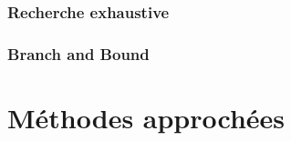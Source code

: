 \documentclass[aspectratio=169,11pt]{beamer}
\begin{document}
	\begin{frame}
		\frametitle{Recherche exhaustive}
		\centering\footnotesize
	\end{frame}

	\begin{frame}
		\centering\footnotesize
		
	\end{frame}

	\begin{frame}
		\centering\footnotesize
	\end{frame}

	\begin{frame}
		\frametitle{Branch and Bound}
		\centering%
		\resizebox{0.85\textwidth}{!}{}%
	\end{frame}

	\begin{frame}
		\centering\footnotesize
	\end{frame}

	\begin{frame}
		\centering\footnotesize
	\end{frame}

	\section{Méthodes approchées}
\end{document}
